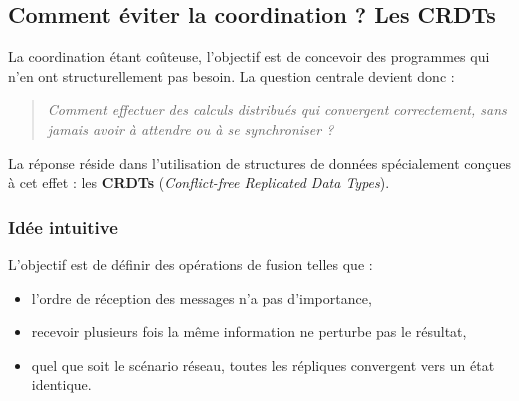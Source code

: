 \documentclass[12pt,a4paper]{article}
\begin{document}
\subsection{Comment éviter la coordination ? Les CRDTs}

La coordination étant coûteuse, l'objectif est de concevoir des programmes
qui n'en ont structurellement pas besoin. La question centrale devient donc :

\begin{quote}
\textit{Comment effectuer des calculs distribués qui convergent correctement,
sans jamais avoir à attendre ou à se synchroniser ?}
\end{quote}

La réponse réside dans l'utilisation de structures de données spécialement conçues
à cet effet : les \textbf{CRDTs} (\textit{Conflict-free Replicated Data Types}).

\subsubsection{Idée intuitive}

L'objectif est de définir des opérations de fusion telles que :
\begin{itemize}
    \item l'ordre de réception des messages n'a pas d'importance,
    \item recevoir plusieurs fois la même information ne perturbe pas le résultat,
    \item quel que soit le scénario réseau, toutes les répliques convergent
    vers un état identique.
\end{itemize}

\begin{center}
\end{center}
\end{document}
